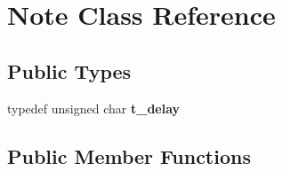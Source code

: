 \hypertarget{class_note}{}\section{Note Class Reference}
\label{class_note}
\subsection*{Public Types}
\begin{DoxyCompactItemize}
\item 
typedef unsigned char {\bfseries t\+\_\+delay}\hypertarget{class_note_aef5c60aeb22ebebffe7d1e68d9375af9}{}\label{class_note_aef5c60aeb22ebebffe7d1e68d9375af9}

\end{DoxyCompactItemize}
\subsection*{Public Member Functions}
